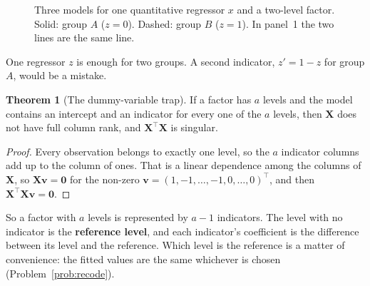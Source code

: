\documentclass[11pt,a4paper]{article}
\numberwithin{equation}{section}
\theoremstyle{definition}
\newtheorem{thm}{Theorem}[subsection]
\begin{document}
\begin{figure}[H]
\centering
{}
\caption{Three models for one quantitative regressor $x$ and a two-level factor. Solid: group $A$
($z = 0$). Dashed: group $B$ ($z = 1$). In panel~1 the two lines are the same line.}
\label{fig:dummy-models}
\end{figure}

One regressor $z$ is enough for two groups. A second indicator, $z' = 1 - z$ for group $A$, would be a
mistake.

\begin{thm}[The dummy-variable trap]\label{thm:dummy-trap}
If a factor has $a$ levels and the model contains an intercept and an indicator for every one of the
$a$ levels, then $\mathbf{X}$ does not have full column rank, and $\mathbf{X}^\top\mathbf{X}$ is singular.
\end{thm}

\begin{proof}
Every observation belongs to exactly one level, so the $a$ indicator columns add up to the column of ones.
That is a linear dependence among the columns of $\mathbf{X}$, so $\mathbf{Xv} = \mathbf{0}$ for the non-zero
$\mathbf{v} = (1, -1, \dots, -1, 0, \dots, 0)^\top$, and then $\mathbf{X}^\top\mathbf{X}\mathbf{v} = \mathbf{0}$.
\end{proof}

So a factor with $a$ levels is represented by $a - 1$ indicators. The level with no indicator is the
\textbf{reference level}, and each indicator's coefficient is the difference between its level and the
reference. Which level is the reference is a matter of convenience: the fitted values are the same
whichever is chosen (Problem~\ref{prob:recode}).
\end{document}

